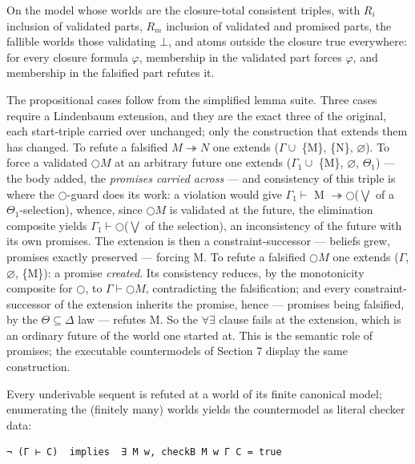 \begin{theorem}\label{thm:truth}
On the model whose
worlds are the closure-total consistent triples, with \ensuremath{R_{i}} inclusion of
validated parts, \ensuremath{R_{m}} inclusion of validated and promised parts, the
fallible worlds those validating \ensuremath{\bot}, and atoms outside the closure
true everywhere: for every closure formula \ensuremath{\varphi}, membership in the
validated part forces \ensuremath{\varphi}, and membership in the falsified part refutes
it.
\end{theorem}

The propositional cases follow from the simplified lemma suite. Three cases
require a Lindenbaum extension, and they are the exact three of the
original, each start-triple carried over unchanged; only the construction
that extends them has changed. To refute a falsified \ensuremath{M \twoheadrightarrow N} one extends
(\ensuremath{\Gamma \cup} \{M\}, \{N\}, \ensuremath{\varnothing}). To force a validated \ensuremath{\bigcirc M} at an arbitrary future one
extends (\ensuremath{\Gamma{}_{1} \cup} \{M\}, \ensuremath{\varnothing}, \ensuremath{\Theta{}_{1}}) --- the body added, the \emph{promises carried
across} --- and consistency of this triple is where the \ensuremath{\bigcirc}-guard does its work: a
violation would give \ensuremath{\Gamma{}_{1} \vdash} M \ensuremath{\twoheadrightarrow \bigcirc}(\ensuremath{\bigvee} of a \ensuremath{\Theta{}_{1}}-selection), whence, since \ensuremath{\bigcirc M}
is validated at the future, the elimination composite yields
\ensuremath{\Gamma{}_{1} \vdash \bigcirc}(\ensuremath{\bigvee} of the selection), an inconsistency of the future with its own
promises. The extension is then a constraint-successor --- beliefs grew,
promises exactly preserved --- forcing M. To refute a falsified \ensuremath{\bigcirc M} one
extends (\ensuremath{\Gamma}, \ensuremath{\varnothing}, \{M\}): a promise \emph{created}. Its consistency reduces, by
the monotonicity composite for \ensuremath{\bigcirc}, to \ensuremath{\Gamma \vdash \bigcirc M}, contradicting the
falsification; and every constraint-successor of the extension inherits
the promise, hence --- promises being falsified, by the \ensuremath{\Theta \subseteq \Delta} law ---
refutes M. So the \ensuremath{\forall\exists} clause fails at the extension, which is an
ordinary future of the world one started at. This is the semantic role
of promises; the executable countermodels
of Section 7 display the same construction.

\begin{corollary}\label{cor:emitter}
Every underivable sequent is refuted at a
world of its finite canonical model; enumerating the (finitely many)
worlds yields the countermodel as literal checker data:

\begin{lstlisting}
¬ (Γ ⊢ C)  implies  ∃ M w, checkB M w Γ C = true
\end{lstlisting}
\end{corollary}

